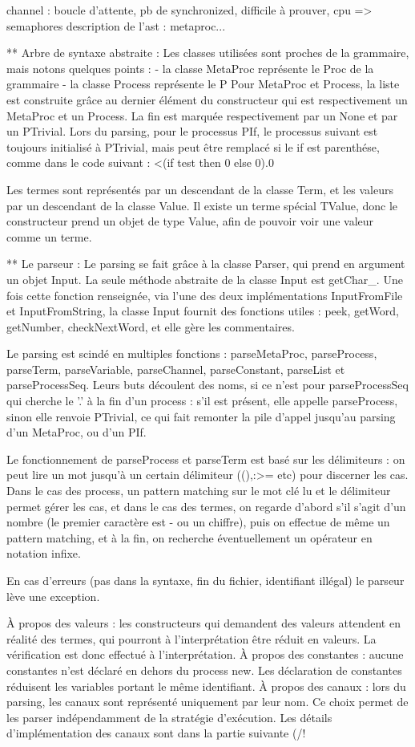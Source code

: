 channel : boucle d'attente, pb de synchronized, difficile à prouver, cpu => semaphores
description de l'ast : metaproc...

** Arbre de syntaxe abstraite :
Les classes utilisées sont proches de la grammaire, mais notons quelques points :
 - la classe MetaProc représente le Proc de la grammaire
 - la classe Process représente le P
Pour MetaProc et Process, la liste est construite grâce au dernier élément du constructeur qui est respectivement un MetaProc et un Process. La fin est marquée respectivement par un None et par un PTrivial.
Lors du parsing, pour le processus PIf, le processus suivant est toujours initialisé à PTrivial, mais peut être remplacé si le if est parenthése, comme dans le code suivant :
<(if test then 0 else 0).0

Les termes sont représentés par un descendant de la classe Term, et les valeurs par un descendant de la classe Value. Il existe un terme spécial TValue, donc le constructeur prend un objet de type Value, afin de pouvoir voir une valeur comme un terme.

** Le parseur :
Le parsing se fait grâce à la classe Parser, qui prend en argument un objet Input.
La seule méthode abstraite de la classe Input est getChar_. Une fois cette fonction renseignée, via l'une des deux implémentations InputFromFile et InputFromString, la classe Input fournit des fonctions utiles : peek, getWord, getNumber, checkNextWord, et elle gère les commentaires.

Le parsing est scindé en multiples fonctions : parseMetaProc, parseProcess, parseTerm, parseVariable, parseChannel, parseConstant, parseList et parseProcessSeq. Leurs buts découlent des noms, si ce n'est pour parseProcessSeq qui cherche le '.' à la fin d'un process : s'il est présent, elle appelle parseProcess, sinon elle renvoie PTrivial, ce qui fait remonter la pile d'appel jusqu'au parsing d'un MetaProc, ou d'un PIf.

Le fonctionnement de parseProcess et parseTerm est basé sur les délimiteurs : on peut lire un mot jusqu'à un certain délimiteur ((),:>= etc) pour discerner les cas. Dans le cas des process, un pattern matching sur le mot clé lu et le délimiteur permet gérer les cas, et dans le cas des termes, on regarde d'abord s'il s'agit d'un nombre (le premier caractère est - ou un chiffre), puis on effectue de même un pattern matching, et à la fin, on recherche éventuellement un opérateur en notation infixe.

En cas d'erreurs (pas dans la syntaxe, fin du fichier, identifiant illégal) le parseur lève une exception.

À propos des valeurs : les constructeurs qui demandent des valeurs attendent en réalité des termes, qui pourront à l'interprétation être réduit en valeurs. La vérification est donc effectué à l'interprétation.
À propos des constantes : aucune constantes n'est déclaré en dehors du process new. Les déclaration de constantes réduisent les variables portant le même identifiant.
À propos des canaux : lors du parsing, les canaux sont représenté uniquement par leur nom. Ce choix permet de les parser indépendamment de la stratégie d'exécution. Les détails d'implémentation des canaux sont dans la partie suivante (/!\)


